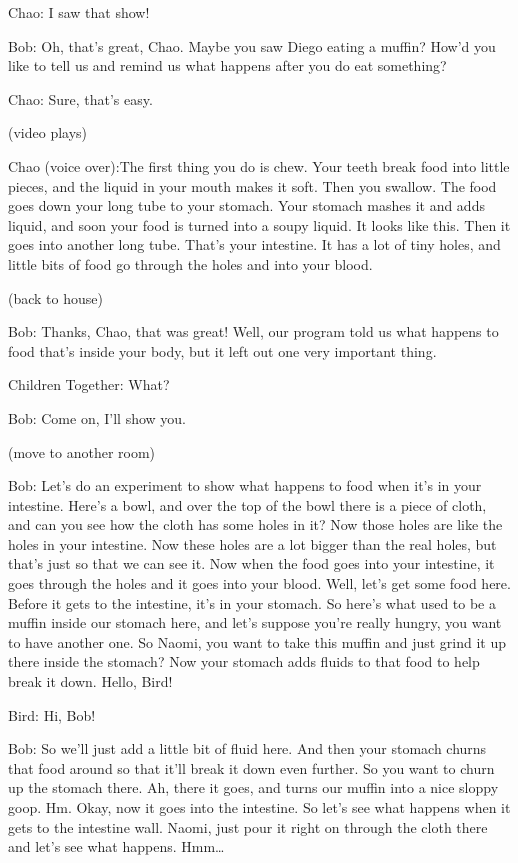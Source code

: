 Chao: I saw that show!

Bob: Oh, that's great, Chao. Maybe you saw Diego eating a muffin? How'd you like to tell us and remind us what happens after you do eat something?

Chao: Sure, that's easy.

(video plays)

Chao (voice over):The first thing you do is chew. Your teeth break food into little pieces, and the liquid in your mouth makes it soft. Then you swallow. The food goes down your long tube to your stomach. Your stomach mashes it and adds liquid, and soon your food is turned into a soupy liquid. It looks like this. Then it goes into another long tube. That's your intestine. It has a lot of tiny holes, and little bits of food go through the holes and into your blood.

(back to house)

Bob: Thanks, Chao, that was great! Well, our program told us what happens to food that's inside your body, but it left out one very important thing.

Children Together: What?

Bob: Come on, I'll show you.

(move to another room)

Bob: Let's do an experiment to show what happens to food when it's in your intestine. Here's a bowl, and over the top of the bowl there is a piece of cloth, and can you see how the cloth has some holes in it? Now those holes are like the holes in your intestine. Now these holes are a lot bigger than the real holes, but that's just so that we can see it. Now when the food goes into your intestine, it goes through the holes and it goes into your blood. Well, let's get some food here. Before it gets to the intestine, it's in your stomach. So here's what used to be a muffin inside our stomach here, and let's suppose you're really hungry, you want to have another one. So Naomi, you want to take this muffin and just grind it up there inside the stomach? Now your stomach adds fluids to that food to help break it down. Hello, Bird!

Bird: Hi, Bob!

Bob: So we'll just add a little bit of fluid here. And then your stomach churns that food around so that it'll break it down even further. So you want to churn up the stomach there. Ah, there it goes, and turns our muffin into a nice sloppy goop. Hm. Okay, now it goes into the intestine. So let's see what happens when it gets to the intestine wall. Naomi, just pour it right on through the cloth there and let's see what happens. Hmm\dots

